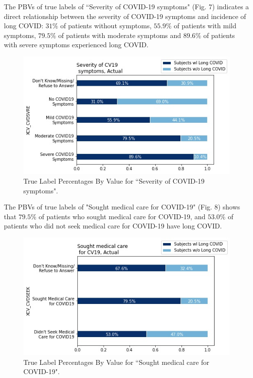 \documentclass{article}
\begin{document}
The PBVs of true labels of ``Severity of COVID-19 symptoms" (Fig. 7) indicates a direct relationship between the severity of COVID-19 symptoms and incidence of long COVID: $31\%$ of patients without symptoms, $55.9\%$ of patients with mild symptoms, $79.5\%$ of patients with moderate symptoms and $89.6\%$ of patients with severe symptoms experienced long COVID.

\begin{figure}[H]
    \center
    \includegraphics[width= \columnwidth]{Figure7.jpeg}
     \caption{True Label Percentages By Value for ``Severity of COVID-19 symptoms".}
     \vspace{-6mm}
  \end{figure}

  
The PBVs of true labels of "Sought medical care for COVID-19" (Fig. 8) shows that $79.5\%$ of patients who sought medical care for COVID-19, and $53.0\%$ of patients who did not seek medical care for COVID-19 have long COVID.

\begin{figure}[H]
    \centering
    \includegraphics[width= \columnwidth]{Figure8.jpeg}
    \caption{True Label Percentages By Value for ``Sought medical care for COVID-19".}
    \vspace{-6mm}
  \end{figure}
 
\end{document}
